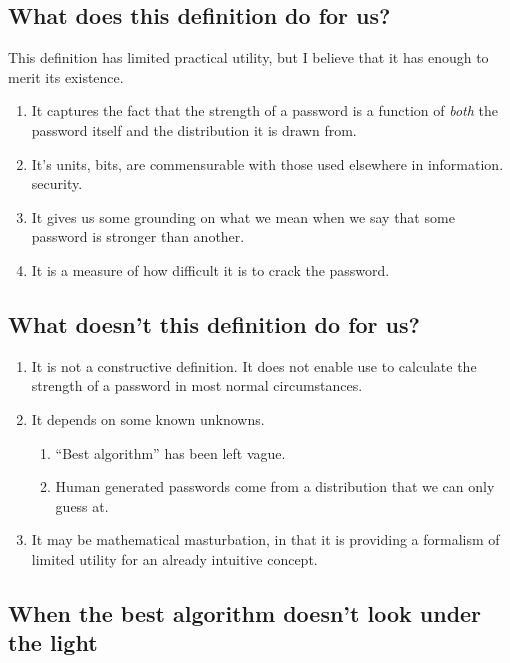\documentclass[12pt]{article}
\begin{document}
\subsection{What does this definition do for us?}

This definition has limited practical utility, but I believe that it has enough to merit its existence.

\begin{enumerate}
\item It captures the fact that the strength of a password is a function of \emph{both} the password itself and the distribution it is drawn from.

\item It's units, bits, are commensurable with those used elsewhere in information. security. 

\item It gives us some grounding on what we mean when we say that some password is stronger than another.

\item It is a measure of how difficult it is to crack the password.

\end{enumerate}

\subsection{What doesn't this definition do for us?}

\begin{enumerate}
\item It is not a constructive definition. It does not enable use to calculate the strength of a password in most normal circumstances.

\item It depends on some known unknowns.
    \begin{enumerate}
    \item ``Best algorithm'' has been left vague.
    \item Human generated passwords come from a distribution that we can only guess at.
    \end{enumerate}
    
\item It may be mathematical masturbation, in that it is providing a formalism of limited utility for an already intuitive concept.
\end{enumerate}

\subsection{When the best algorithm doesn't look under the light}
\end{document}
